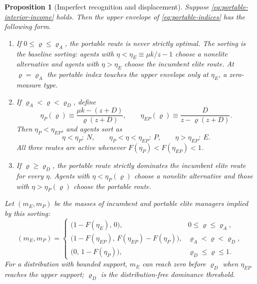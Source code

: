 \documentclass[12pt,letterpaper]{article}
\newtheorem{proposition}{Proposition}
\theoremstyle{definition}
\begin{document}
\begin{proposition}[Imperfect recognition and displacement]\label{prop:portability}
Suppose \eqref{eq:portable-interior-income} holds.
Then the upper envelope of \eqref{eq:portable-indices} has the following form.
\begin{enumerate}
\item If $0\leq\varrho\leq\varrho_A$, the portable route is never strictly optimal.
The sorting is the baseline sorting: agents with
$\eta<\eta_E\equiv\mu k/z-1$ choose a nonelite alternative and agents with
$\eta>\eta_E$ choose the incumbent elite route.
At $\varrho=\varrho_A$ the portable index touches the upper envelope only at
$\eta_E$, a zero-measure type.
\item If $\varrho_A<\varrho<\varrho_D$, define
\begin{equation}\label{eq:portable-cutoffs}
  \eta_P(\varrho)
  \equiv
  \frac{\mu k-(z+D)}{\varrho(z+D)},
  \qquad
  \eta_{EP}(\varrho)
  \equiv
  \frac{D}{z-\varrho(z+D)} .
\end{equation}
Then $\eta_P<\eta_{EP}$, and agents sort as
\[
  \eta<\eta_P:\ N,
  \qquad
  \eta_P<\eta<\eta_{EP}:\ P,
  \qquad
  \eta>\eta_{EP}:\ E.
\]
All three routes are active whenever
$F(\eta_P)<F(\eta_{EP})<1$.
\item If $\varrho\geq\varrho_D$, the portable route strictly dominates the incumbent
elite route for every $\eta$.
Agents with $\eta<\eta_P(\varrho)$ choose a nonelite alternative and those with
$\eta>\eta_P(\varrho)$ choose the portable route.
\end{enumerate}

Let $(m_E,m_P)$ be the masses of incumbent and portable elite managers implied by this
sorting:
\begin{equation}\label{eq:portable-masses}
(m_E,m_P)
=
\begin{cases}
\big(1-F(\eta_E),\,0\big),
  & 0\leq\varrho\leq\varrho_A,\\[2mm]
\big(1-F(\eta_{EP}),\,F(\eta_{EP})-F(\eta_P)\big),
  & \varrho_A<\varrho<\varrho_D,\\[2mm]
\big(0,\,1-F(\eta_P)\big),
  & \varrho_D\leq\varrho\leq1.
\end{cases}
\end{equation}
For a distribution with bounded support, $m_E$ can reach zero before
$\varrho_D$ when $\eta_{EP}$ reaches the upper support; $\varrho_D$ is the
distribution-free dominance threshold.


\end{proposition}
\end{document}
